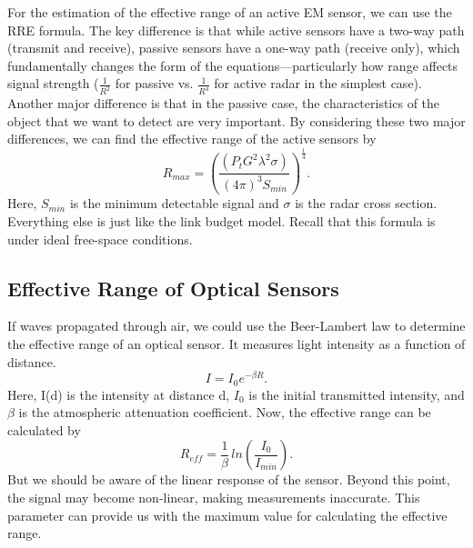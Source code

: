 \documentclass{article}
\begin{document}
For the estimation of the effective range of an active EM sensor, we can use the RRE formula.
The key difference is that while active sensors have a two-way path (transmit and receive), passive sensors have a one-way path (receive only), which fundamentally changes the form of the equations—particularly how range affects signal strength ($\frac{1}{R^2}$ for passive vs. $\frac{1}{R^4}$ for active radar in the simplest case). Another major difference is that in the passive case, the characteristics of the object that we want to detect are very important. By considering these two major differences, we can find the effective range of the active sensors by
\begin{equation}
    R_{max}=\left(\frac{(P_tG^2\lambda^2\sigma)}{(4\pi)^3S_{min}}\right)^{\frac{1}{4}}.
\end{equation}
Here, $S_{min}$ is the minimum detectable signal and $\sigma$ is the radar cross section. Everything else is just like the link budget model.
Recall that this formula is under ideal free-space conditions. 
 \subsection{Effective Range of Optical Sensors}
 If waves propagated through air, we could use the Beer-Lambert law to determine the effective range of an optical sensor. It measures light intensity as a function of distance.
 \begin{equation}
     I = I_0 e^{-\beta R}.
 \end{equation}
 Here, I(d) is the intensity at distance d, $I_0$ is the initial transmitted intensity, and $\beta$ is the atmospheric attenuation coefficient. Now, the effective range can be calculated by
 \begin{equation}
     R_{eff} = \frac{1}{\beta}\, ln(\frac{I_0}{I_{min}}).
     \label{eq;Beer-Lambert}
 \end{equation}
 But we should be aware of the linear response of the sensor. Beyond this point, the signal may become non-linear, making measurements inaccurate. This parameter can provide us with the maximum value for calculating the effective range.
\end{document}
